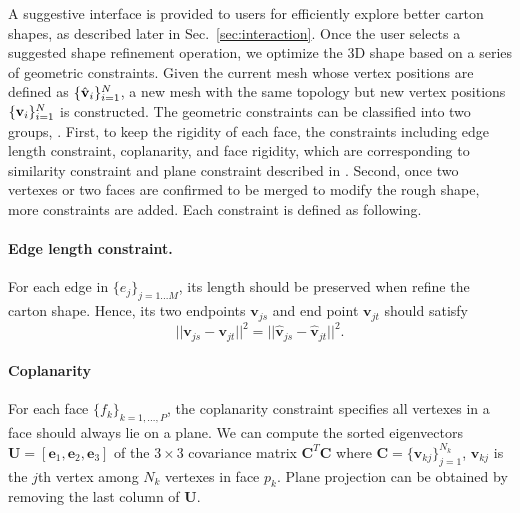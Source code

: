
A suggestive interface is provided to users for efficiently explore better carton shapes, as described later in Sec.~\ref{sec:interaction}. 
%
Once the user selects a suggested shape refinement operation, we optimize the 3D shape based on a series of geometric constraints.
Given the current mesh whose vertex positions are defined as $\{\hat{\mathbf{v}}_i\}^{N}_{i=1}$, a new mesh with the same topology but new vertex positions $\{\mathbf{v}_i\}^{N}_{i=1}$ is constructed.
%
The geometric constraints can be classified into two groups, .
% 
First, to keep the rigidity of each face, the constraints including edge length constraint, coplanarity, and face rigidity, which are corresponding to similarity constraint and plane constraint described in \cite{Bouaziz:2012:SSD:2346796.2346802}. 
%
Second, once two vertexes or two faces are confirmed to be merged to modify the rough shape, more constraints are added. 
%
Each constraint is defined as following.  

\paragraph{Edge length constraint.} 
For each edge in $\{e_j\}_{j=1...M}$, its length should be preserved when refine the carton shape.
Hence, its two endpoints $\mathbf{v}_{js}$ and end point $\mathbf{v}_{jt}$ should satisfy 
\begin{equation}
||\mathbf{v}_{js} - \mathbf{v}_{jt}||^2 = ||\mathbf{\hat{v}}_{js} - \mathbf{\hat{v}}_{jt}||^2.
\label{equ:edge}
\end{equation}

\paragraph{Coplanarity} {For each face $\{f_k\}_{k=1,\dots,P}$, the coplanarity constraint specifies all vertexes in a face should always lie on a plane. 
We can compute the sorted eigenvectors $\mathbf{U} = [\mathbf{e}_1, \mathbf{e}_2, \mathbf{e}_3]$ of the $ 3 \times 3$ covariance matrix $\mathbf{C}^T\mathbf{C}$ where $\mathbf{C} = \{\mathbf{v}_{kj}\}_{j=1}^{N_k}$, $\mathbf{v}_{kj}$ is the $j$th vertex among $N_k$ vertexes in face $p_k$}. Plane projection can be obtained by removing the last column of $\mathbf{U}$. 


